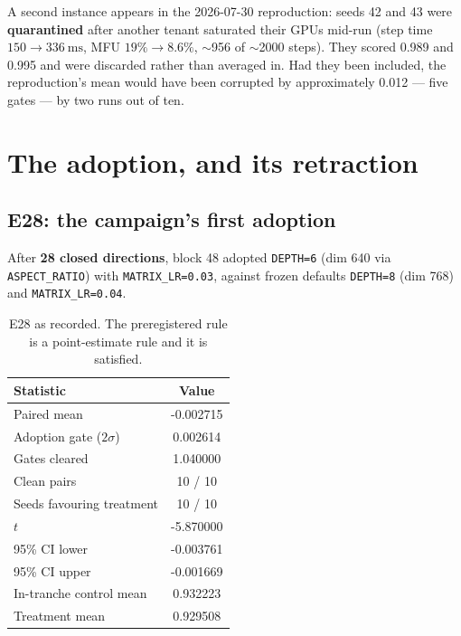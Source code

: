 \documentclass[11pt,a4paper]{article}
\newcommand{\gate}{\ensuremath{2\sigma}}
\begin{document}
A second instance appears in the 2026-07-30 reproduction: seeds 42 and 43 were
\textbf{quarantined} after another tenant saturated their GPUs mid-run (step time
$150 \rightarrow \SI{336}{\milli\second}$, MFU $19\% \rightarrow 8.6\%$, $\sim$956 of
$\sim$2000 steps). They scored \num{0.989} and \num{0.995} and were discarded rather than
averaged in. Had they been included, the reproduction's mean would have been corrupted by
approximately \num{0.012} --- five gates --- by two runs out of ten.

\section{The adoption, and its retraction}

\subsection{E28: the campaign's first adoption}

After \textbf{28 closed directions}, block 48 adopted \texttt{DEPTH=6} (dim 640 via
\texttt{ASPECT\_RATIO}) with \texttt{MATRIX\_LR=0.03}, against frozen defaults
\texttt{DEPTH=8} (dim 768) and \texttt{MATRIX\_LR=0.04}.

\begin{table}[h]
\centering
\small
\begin{tabular}{@{}lS[table-format=-1.6]@{}}
\toprule
\textbf{Statistic} & {\textbf{Value}} \\
\midrule
Paired mean                     & -0.002715 \\
Adoption gate (\gate{})         &  0.002614 \\
Gates cleared                   &  1.040000 \\
Clean pairs                     & {10 / 10} \\
Seeds favouring treatment       & {10 / 10} \\
$t$                             & -5.870000 \\
95\% CI lower                   & -0.003761 \\
95\% CI upper                   & -0.001669 \\
In-tranche control mean         &  0.932223 \\
Treatment mean                  &  0.929508 \\
\bottomrule
\end{tabular}
\caption{E28 as recorded. The preregistered rule is a point-estimate rule and it is
satisfied.}
\end{table}
\end{document}
